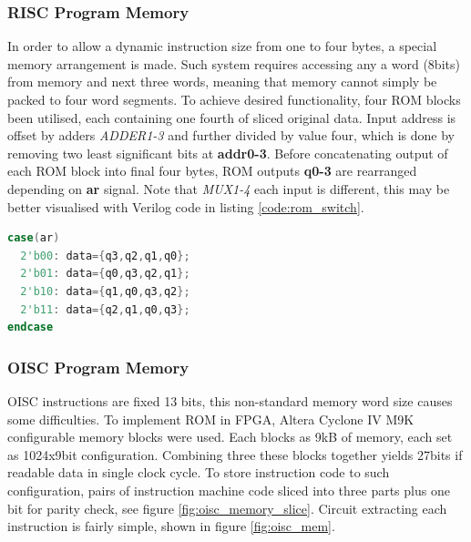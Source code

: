 \subsubsection{RISC Program Memory}
In order to allow a dynamic instruction size from one to four bytes, a special memory arrangement is made. Such system requires accessing any a word (8bits) from memory and next three words, meaning that memory cannot simply be packed to four word segments. To achieve desired functionality, four ROM blocks been utilised, each containing one fourth of sliced original data. Input address is offset by adders \textit{ADDER1-3} and further divided by value four, which is done by removing two least significant bits at \textbf{addr0-3}. 
Before concatenating output of each ROM block into final four bytes, ROM outputs \textbf{q0-3} are rearranged depending on \textbf{ar} signal. Note that \textit{MUX1-4} each input is different, this may be better visualised with Verilog code in listing \ref{code:rom_switch}.


\begin{blockpage}
\begin{lstlisting}[frame=single, language=Verilog, caption={RISC sliced ROM memory multiplexer arrangement Verilog code}, emph={ar, data}, label=code:rom_switch]
case(ar)
  2'b00: data={q3,q2,q1,q0};
  2'b01: data={q0,q3,q2,q1};
  2'b10: data={q1,q0,q3,q2};
  2'b11: data={q2,q1,q0,q3};
endcase
\end{lstlisting}
\end{blockpage}

\subsubsection{OISC Program Memory}\label{subsec:oisc_mem}
OISC instructions are fixed 13 bits, this non-standard memory word size causes some difficulties. To implement ROM in FPGA, Altera Cyclone IV M9K configurable memory blocks were used. Each blocks as 9kB of memory, each set as 1024x9bit configuration. Combining three these blocks together yields 27bits if readable data in single clock cycle. To store instruction code to such configuration, pairs of instruction machine code sliced into three parts plus one bit for parity check, see figure \ref{fig:oisc_memory_slice}. Circuit extracting each instruction is fairly simple, shown in figure \ref{fig:oisc_mem}.

